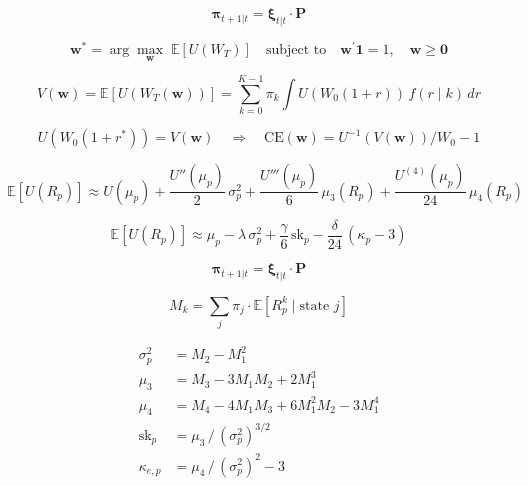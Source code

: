 \documentclass[11pt, a4paper]{article}
\begin{document}
\begin{equation}
  \boldsymbol{\pi}_{t+1|t} = \boldsymbol{\xi}_{t|t} \cdot \mathbf{P}
  \label{eq:predictive}
\end{equation}

\begin{equation}
  \mathbf{w}^* = \arg\max_{\mathbf{w}} \;\mathbb{E}\!\left[U(W_T)\right]
  \quad \text{subject to} \quad
  \mathbf{w}^\prime \mathbf{1} = 1, \quad \mathbf{w} \geq \mathbf{0}
  \label{eq:optimisation}
\end{equation}

\begin{equation}
  V(\mathbf{w}) = \mathbb{E}\!\left[U(W_T(\mathbf{w}))\right]
               = \sum_{k=0}^{K-1} \pi_k \int U(W_0(1+r))\, f(r \mid k)\, dr
  \label{eq:welfare}
\end{equation}

\begin{equation}
  U\!\left(W_0(1 + r^*)\right) = V(\mathbf{w})
  \quad\Longrightarrow\quad
  \text{CE}(\mathbf{w}) = U^{-1}\!\left(V(\mathbf{w})\right) / W_0 - 1
  \label{eq:ce}
\end{equation}

\begin{equation}
  \mathbb{E}\!\left[U(R_p)\right]
  \approx U(\mu_p)
  + \frac{U''(\mu_p)}{2}\,\sigma^2_p
  + \frac{U'''(\mu_p)}{6}\,\mu_3(R_p)
  + \frac{U^{(4)}(\mu_p)}{24}\,\mu_4(R_p)
  \label{eq:taylor_full}
\end{equation}

\begin{equation}
  \mathbb{E}\!\left[U(R_p)\right] \approx
  \mu_p
  - \lambda\,\sigma^2_p
  + \frac{\gamma}{6}\,\text{sk}_p
  - \frac{\delta}{24}\,(\kappa_p - 3)
  \label{eq:taylor_utility}
\end{equation}

\begin{equation}
  \boldsymbol{\pi}_{t+1|t} = \boldsymbol{\xi}_{t|t} \cdot \mathbf{P}
\end{equation}

\begin{equation}
  M_k = \sum_{j} \pi_j \cdot \mathbb{E}\!\left[R_p^k \mid \text{state } j\right]
\end{equation}

\begin{align}
  \sigma^2_p     &= M_2 - M_1^2 \\
  \mu_3          &= M_3 - 3M_1 M_2 + 2M_1^3 \\
  \mu_4          &= M_4 - 4M_1 M_3 + 6M_1^2 M_2 - 3M_1^4 \\
  \text{sk}_p    &= \mu_3 \,/\, (\sigma^2_p)^{3/2} \\
  \kappa_{e,p}   &= \mu_4 \,/\, (\sigma^2_p)^{2} - 3
\end{align}
\end{document}
